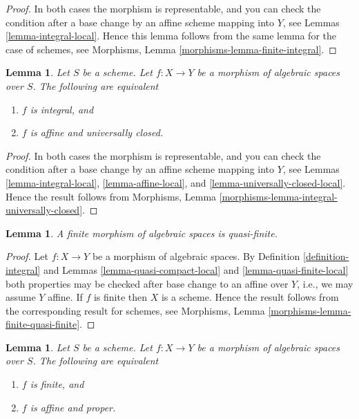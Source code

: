 \documentclass{stacks-project}
\theoremstyle{plain}
\newtheorem{lemma}[subsection]{Lemma}
\theoremstyle{definition}
\theoremstyle{remark}
\numberwithin{equation}{subsection}
\begin{document}
\begin{proof}
In both cases the morphism is representable, and you can check the condition
after a base change by an affine scheme mapping into $Y$, see
Lemmas \ref{lemma-integral-local}. Hence this lemma follows from the
same lemma for the case of schemes, see
Morphisms, Lemma \ref{morphisms-lemma-finite-integral}.
\end{proof}

\begin{lemma}
\label{lemma-integral-universally-closed}
Let $S$ be a scheme.
Let $f : X \to Y$ be a morphism of algebraic spaces over $S$.
The following are equivalent
\begin{enumerate}
\item $f$ is integral, and
\item $f$ is affine and universally closed.
\end{enumerate}
\end{lemma}

\begin{proof}
In both cases the morphism is representable, and you can check the condition
after a base change by an affine scheme mapping into $Y$, see
Lemmas \ref{lemma-integral-local},
\ref{lemma-affine-local}, and
\ref{lemma-universally-closed-local}.
Hence the result follows from
Morphisms, Lemma \ref{morphisms-lemma-integral-universally-closed}.
\end{proof}

\begin{lemma}
\label{lemma-finite-quasi-finite}
A finite morphism of algebraic spaces is quasi-finite.
\end{lemma}

\begin{proof}
Let $f : X \to Y$ be a morphism of algebraic spaces.
By
Definition \ref{definition-integral}
and
Lemmas \ref{lemma-quasi-compact-local} and
\ref{lemma-quasi-finite-local}
both properties may be checked after base change to an affine over $Y$,
i.e., we may assume $Y$ affine.
If $f$ is finite then $X$ is a scheme.
Hence the result follows from the corresponding result for schemes, see
Morphisms, Lemma \ref{morphisms-lemma-finite-quasi-finite}.
\end{proof}

\begin{lemma}
\label{lemma-finite-proper}
Let $S$ be a scheme. Let $f : X \to Y$ be a morphism of algebraic spaces over
$S$. The following are equivalent
\begin{enumerate}
\item $f$ is finite, and
\item $f$ is affine and proper.
\end{enumerate}
\end{lemma}
\end{document}
